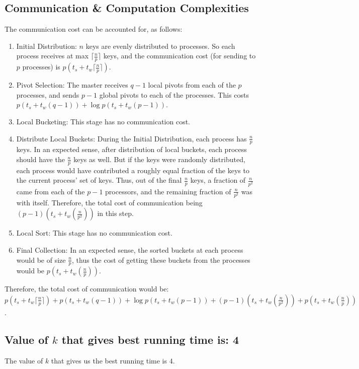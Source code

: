 \documentclass{article}
\begin{document}
\subsection{Communication \& Computation Complexities}
The communication cost can be accounted for, as follows:
\begin{enumerate}
\item Initial Distribution: $n$ keys are evenly distributed to processes. So each process
receives at max $\lceil\frac{n}{p}\rceil$ keys, and the communication cost (for sending to $p$ processes) is
$p(t_s + t_w\lceil\frac{n}{p}\rceil)$.
\item Pivot Selection: The master receives $q-1$ local pivots from each of the $p$ processes, 
and sends $p-1$ global pivots to each of the processes. This costs $p(t_s + t_w(q-1)) + 
\log{p}(t_s + t_w(p-1))$.
\item Local Bucketing: This stage has no communication cost.
\item Distribute Local Buckets: During the Initial Distribution, each process has $\frac{n}{p}$
keys. In an expected sense, after distribution of local buckets, each process should have 
the $\frac{n}{p}$ keys as well. But if the keys were randomly distributed, each process would have
contributed a roughly equal fraction of the keys to the current process' set of keys. Thus, out of
the final $\frac{n}{p}$ keys, a fraction of $\frac{n}{p^2}$ came from each of the $p-1$ processors,
and the remaining fraction of $\frac{n}{p^2}$ was with itself. Therefore, the total cost of 
communication being $(p-1)(t_s + t_w(\frac{n}{p^2}))$ in this step.
\item Local Sort: This stage has no communication cost.
\item Final Collection: In an expected sense, the sorted buckets at each process would be of size
$\frac{n}{p}$, thus the cost of getting these buckets from the processes would be
$p(t_s + t_w(\frac{n}{p}))$.
\end{enumerate}
Therefore, the total cost of communication would be: $p(t_s + t_w\lceil\frac{n}{p}\rceil) + p(t_s + t_w(q-1)) + 
\log{p}(t_s + t_w(p-1)) + (p-1)(t_s + t_w(\frac{n}{p^2})) + p(t_s + t_w(\frac{n}{p}))$.

\subsection{Value of $k$ that gives best running time is: 4}

The value of $k$ that gives us the best running time is $4$.
\end{document}
